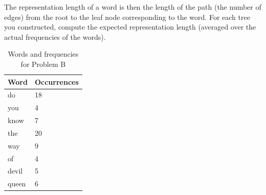 The representation length of a word is then the length of the path (the number of edges) from the root to the leaf node corresponding to the word. For each tree you constructed, compute the expected representation length (averaged over the actual frequencies of the words).

\begin{table}[]
\centering
\caption{Words and frequencies for Problem B}
\begin{tabular}{|l|l|}
\hline
Word  & Occurrences \\ \hline
do    & 18          \\
you   & 4           \\
know  & 7           \\
the   & 20          \\
way   & 9          \\
of    & 4           \\
devil & 5           \\
queen & 6           \\ \hline
\end{tabular}
\end{table}

